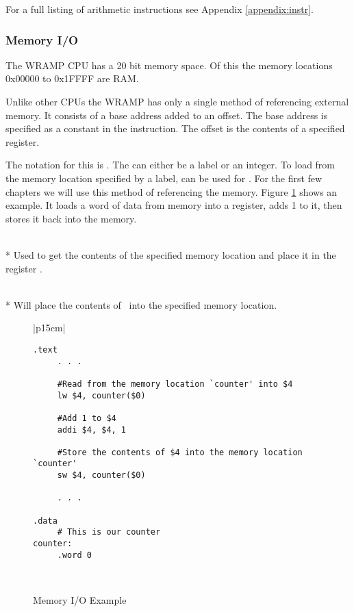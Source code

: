 For a full listing of arithmetic instructions see  Appendix 
\ref{appendix:instr}.


\subsubsection{Memory I/O}
The WRAMP CPU has a 20 bit memory space.  Of this the memory locations 
0x00000 to 0x1FFFF are RAM.

Unlike other CPUs the WRAMP has only a single method of referencing
external memory.  It consists of a base address added to an offset.
The base address is specified as a constant in the instruction.  The
offset is the contents of a specified register.

The notation for this is .  The  can either
be a label or an integer.  To load from the memory location specified
by a label,  can be used for \regs.  For the first few chapters
we will use this method of referencing the memory. Figure \ref{memio}
shows an example. It loads a word of data from memory into a register,
adds 1 to it, then stores it back into the memory.


\\*
Used to get the contents of the specified memory location and place it 
in the register \regd.

\\*
Will place the contents of \regd\ into the specified memory location.
\\


\begin{figure}[btp]
\begin{center}
\begin{tabular}{|p{15cm}|}
\hline
\begin{verbatim}
.text
     . . .

     #Read from the memory location `counter' into $4
     lw $4, counter($0)

     #Add 1 to $4
     addi $4, $4, 1

     #Store the contents of $4 into the memory location `counter'
     sw $4, counter($0)

     . . .
     
.data
     # This is our counter
counter:
     .word 0 
\end{verbatim}%
\\
\hline
\end{tabular}
\end{center}
\caption{Memory I/O Example}
\label{memio}
\end{figure}

